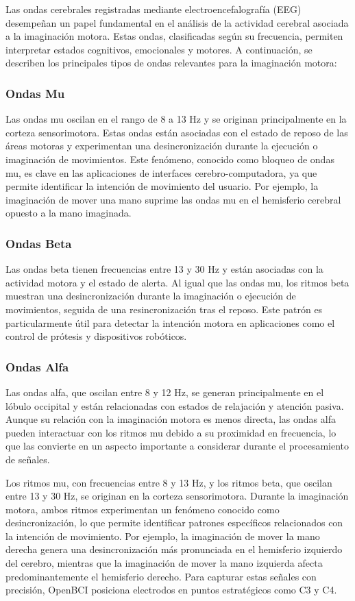 Las ondas cerebrales registradas mediante electroencefalografía (EEG) desempeñan un papel fundamental en el análisis de la actividad cerebral asociada a la imaginación motora. Estas ondas, clasificadas según su frecuencia, permiten interpretar estados cognitivos, emocionales y motores. A continuación, se describen los principales tipos de ondas relevantes para la imaginación motora:

\subsubsection{Ondas Mu}
Las ondas mu oscilan en el rango de 8 a 13 Hz y se originan principalmente en la corteza sensorimotora. Estas ondas están asociadas con el estado de reposo de las áreas motoras y experimentan una desincronización durante la ejecución o imaginación de movimientos. Este fenómeno, conocido como bloqueo de ondas mu, es clave en las aplicaciones de interfaces cerebro-computadora, ya que permite identificar la intención de movimiento del usuario. Por ejemplo, la imaginación de mover una mano suprime las ondas mu en el hemisferio cerebral opuesto a la mano imaginada.

\subsubsection{Ondas Beta}
Las ondas beta tienen frecuencias entre 13 y 30 Hz y están asociadas con la actividad motora y el estado de alerta. Al igual que las ondas mu, los ritmos beta muestran una desincronización durante la imaginación o ejecución de movimientos, seguida de una resincronización tras el reposo. Este patrón es particularmente útil para detectar la intención motora en aplicaciones como el control de prótesis y dispositivos robóticos.

\subsubsection{Ondas Alfa}
Las ondas alfa, que oscilan entre 8 y 12 Hz, se generan principalmente en el lóbulo occipital y están relacionadas con estados de relajación y atención pasiva. Aunque su relación con la imaginación motora es menos directa, las ondas alfa pueden interactuar con los ritmos mu debido a su proximidad en frecuencia, lo que las convierte en un aspecto importante a considerar durante el procesamiento de señales.

Los ritmos mu, con frecuencias entre 8 y 13 Hz, y los ritmos beta, que oscilan entre 13 y 30 Hz, se originan en la corteza sensorimotora. Durante la imaginación motora, ambos ritmos experimentan un fenómeno conocido como desincronización, lo que permite identificar patrones específicos relacionados con la intención de movimiento. Por ejemplo, la imaginación de mover la mano derecha genera una desincronización más pronunciada en el hemisferio izquierdo del cerebro, mientras que la imaginación de mover la mano izquierda afecta predominantemente el hemisferio derecho. Para capturar estas señales con precisión, OpenBCI posiciona electrodos en puntos estratégicos como C3 y C4.

